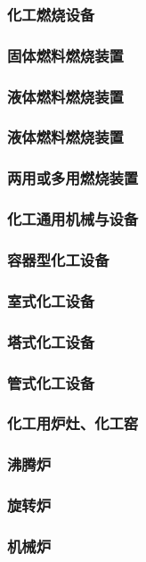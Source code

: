 \documentclass[UTF8]{../../ApplicationUniverse}
\begin{document}
    \subsubsection{化工燃烧设备}
        \subsubsection{固体燃料燃烧装置}
        \subsubsection{液体燃料燃烧装置}
        \subsubsection{液体燃料燃烧装置}
        \subsubsection{两用或多用燃烧装置}
\subsubsection{化工通用机械与设备}
    \subsubsection{容器型化工设备}
    \subsubsection{室式化工设备}
    \subsubsection{塔式化工设备}
    \subsubsection{管式化工设备}
\subsubsection{化工用炉灶、化工窑}
    \subsubsection{沸腾炉}
    \subsubsection{旋转炉}
    \subsubsection{机械炉}
\end{document}
